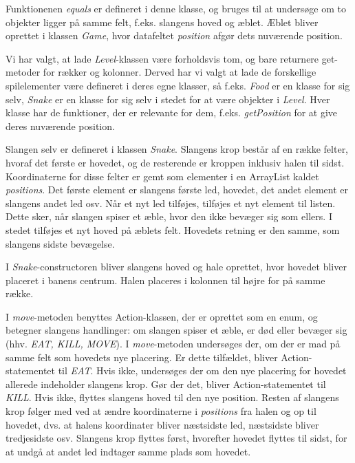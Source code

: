 Funktionenen \textit{equals} er defineret i denne klasse, og bruges til at undersøge om to objekter ligger på samme felt, f.eks. slangens hoved og æblet. Æblet bliver oprettet i klassen \textit{Game}, hvor datafeltet \textit{position} afgør dets nuværende position.

Vi har valgt, at lade \textit{Level}-klassen være forholdsvis tom, og bare returnere get-metoder for rækker og kolonner. Derved har vi valgt at lade de forskellige spilelementer være defineret i deres egne klasser, så f.eks. \textit{Food} er en klasse for sig selv, \textit{Snake} er en klasse for sig selv i stedet for at være objekter i \textit{Level}. Hver klasse har de funktioner, der er relevante for dem, f.eks. \textit{getPosition} for at give deres nuværende position. 

Slangen selv er defineret i klassen \textit{Snake}. Slangens krop består af en række felter, hvoraf det første er hovedet, og de resterende er kroppen inklusiv halen til sidst. Koordinaterne for disse felter er gemt som elementer i en ArrayList kaldet \textit{positions}. Det første element er slangens første led, hovedet, det andet element er slangens andet led osv. Når et nyt led tilføjes, tilføjes et nyt element til listen. Dette sker, når slangen spiser et æble, hvor den ikke bevæger sig som ellers. I stedet tilføjes et nyt hoved på æblets felt. Hovedets retning er den samme, som slangens sidste bevægelse.

I \textit{Snake}-constructoren bliver slangens hoved og hale oprettet, hvor hovedet bliver placeret i banens centrum. Halen placeres i kolonnen til højre for på samme række.

I \textit{move}-metoden benyttes Action-klassen, der er oprettet som en enum, og betegner slangens handlinger: om slangen spiser et æble, er død eller bevæger sig (hhv. \textit{EAT, KILL, MOVE}). I \textit{move}-metoden undersøges der, om der er mad på samme felt som hovedets nye placering. Er dette tilfældet, bliver Action-statementet til \textit{EAT}. Hvis ikke, undersøges der om den nye placering for hovedet allerede indeholder slangens krop. Gør der det, bliver Action-statementet til \textit{KILL}. Hvis ikke, flyttes slangens hoved til den nye position. Resten af slangens krop følger med ved at ændre koordinaterne i \textit{positions} fra halen og op til hovedet, dvs. at halens koordinater bliver næstsidste led, næstsidste bliver tredjesidste osv. Slangens krop flyttes først, hvorefter hovedet flyttes til sidst, for at undgå at andet led indtager samme plads som hovedet.

